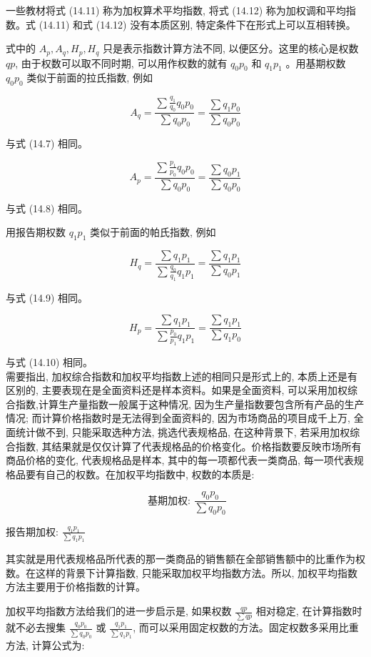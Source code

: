\documentclass[10pt]{article}
\begin{document}
\begin{CJK*}{UTF8}{bsmi}
一些教材将式 (14.11) 称为加权算术平均指数, 将式 (14.12) 称为加权调和平均指数。式 (14.11) 和式 (14.12) 没有本质区别, 特定条件下在形式上可以互相转换。

式中的 $A_{p}, A_{q}, H_{p}, H_{q}$ 只是表示指数计算方法不同, 以便区分。这里的核心是权数 $q p$, 由于权数可以取不同时期, 可以用作权数的就有 $q_{0} p_{0}$ 和 $q_{1} p_{1}$ 。用基期权数 $q_{0} p_{0}$ 类似于前面的拉氏指数, 例如

$$
A_{q}=\frac{\sum \frac{q_{1}}{q_{0}} q_{0} p_{0}}{\sum q_{0} p_{0}}=\frac{\sum q_{1} p_{0}}{\sum q_{0} p_{0}}
$$

与式 (14.7) 相同。

$$
A_{p}=\frac{\sum \frac{p_{1}}{p_{0}} q_{0} p_{0}}{\sum q_{0} p_{0}}=\frac{\sum q_{0} p_{1}}{\sum q_{0} p_{0}}
$$

与式 (14.8) 相同。

用报告期权数 $q_{1} p_{1}$ 类似于前面的帕氏指数, 例如

$$
H_{q}=\frac{\sum q_{1} p_{1}}{\sum \frac{q_{0}}{q_{1}} q_{1} p_{1}}=\frac{\sum q_{1} p_{1}}{\sum q_{0} p_{1}}
$$

与式 (14.9) 相同。

$$
H_{p}=\frac{\sum q_{1} p_{1}}{\sum \frac{p_{0}}{p_{1}} q_{1} p_{1}}=\frac{\sum q_{1} p_{1}}{\sum q_{1} p_{0}}
$$

与式 (14.10) 相同。\\
需要指出, 加权综合指数和加权平均指数上述的相同只是形式上的, 本质上还是有区别的, 主要表现在是全面资料还是样本资料。如果是全面资料, 可以采用加权综合指数,计算生产量指数一般属于这种情况, 因为生产量指数要包含所有产品的生产情况; 而计算价格指数时是无法得到全面资料的, 因为市场商品的项目成千上万, 全面统计做不到, 只能采取选种方法, 挑选代表规格品, 在这种背景下, 若采用加权综合指数, 其结果就是仅仅计算了代表规格品的价格变化。价格指数要反映市场所有商品价格的变化, 代表规格品是样本, 其中的每一项都代表一类商品, 每一项代表规格品要有自己的权数。在加权平均指数中, 权数的本质是:

$$
\text { 基期加权: } \frac{q_{0} p_{0}}{\sum q_{0} p_{0}}
$$

报告期加权: $\frac{q_{1} p_{1}}{\sum q_{1} p_{1}}$

其实就是用代表规格品所代表的那一类商品的销售额在全部销售额中的比重作为权数。在这样的背景下计算指数, 只能采取加权平均指数方法。所以, 加权平均指数方法主要用于价格指数的计算。

加权平均指数方法给我们的进一步启示是, 如果权数 $\frac{q p}{\sum q p}$ 相对稳定, 在计算指数时就不必去搜集 $\frac{q_{0} p_{0}}{\sum q_{0} p_{0}}$ 或 $\frac{q_{1} p_{1}}{\sum q_{1} p_{1}}$, 而可以采用固定权数的方法。固定权数多采用比重方法, 计算公式为:



\end{CJK*}
\end{document}
